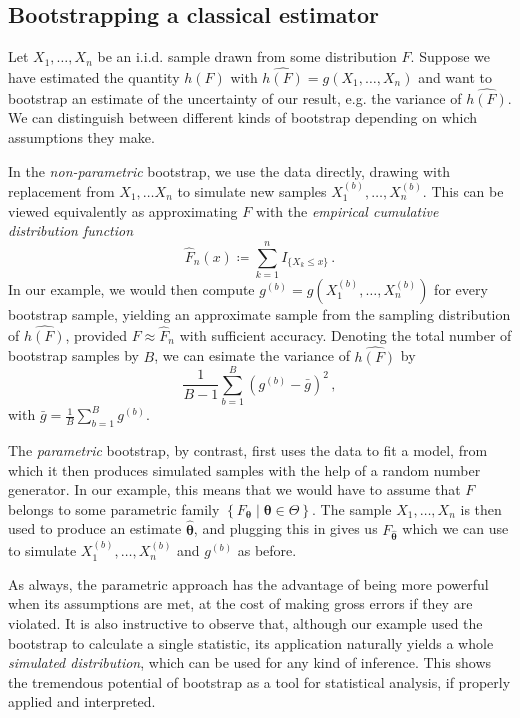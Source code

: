 \documentclass[a4paper]{book}
\theoremstyle{plain}
\begin{document}
\subsection{Bootstrapping a classical estimator}

Let $X_1, \dots, X_n$ be an i.i.d. sample drawn from some distribution $F$. Suppose we have estimated the quantity $h(F)$ with $\widehat{h(F)} = g(X_1, \dots, X_n)$ and want to bootstrap an estimate of the uncertainty of our result, e.g. the variance of $\widehat{h(F)}$. We can distinguish between different kinds of bootstrap depending on which assumptions they make.

In the \emph{non-parametric} bootstrap, we use the data directly, drawing with replacement from $X_1, \dots X_n$ to simulate new samples $X^{(b)}_1, \dots, X^{(b)}_n$. This can be viewed equivalently as approximating $F$ with the \emph{empirical cumulative distribution function}
\begin{equation}
    \hat{F}_n(x) \coloneqq \sum_{k=1}^n I_{\{ X_k \leq x \}} \,.
\end{equation}
In our example, we would then compute $g^{(b)} = g(X^{(b)}_1, \dots, X^{(b)}_n)$ for every bootstrap sample, yielding an approximate sample from the sampling distribution of $\widehat{h(F)}$, provided $F \approx \hat{F}_n$ with sufficient accuracy. Denoting the total number of bootstrap samples by $B$, we can esimate the variance of $\widehat{h(F)}$ by
\begin{equation}
    \frac{1}{B-1}\sum_{b=1}^B(g^{(b)} - \bar{g})^2 \,,
\end{equation}
with $\bar{g} = \frac{1}{B} \sum_{b=1}^B g^{(b)}$.

The \emph{parametric} bootstrap, by contrast, first uses the data to fit a model, from which it then produces simulated samples with the help of a random number generator. In our example, this means that we would have to assume that $F$ belongs to some parametric family $\left \{ F_{\bm{\theta}} \mid  \bm{\theta} \in \Theta \right \}$. The sample $X_1, \dots, X_n$ is then used to produce an estimate $\bm{\hat{\theta}}$, and plugging this in gives us $F_{\bm{\hat{\theta}}}$ which we can use to simulate $X^{(b)}_1, \dots , X^{(b)}_n$ and $g^{(b)}$ as before. 

As always, the parametric approach has the advantage of being more powerful when its assumptions are met, at the cost of making gross errors if they are violated. It is also instructive to observe that, although our example used the bootstrap to calculate a single statistic, its application naturally yields a whole \emph{simulated distribution}, which can be used for any kind of inference. This shows the tremendous potential of bootstrap as a tool for statistical analysis, if properly applied and interpreted.
\end{document}

